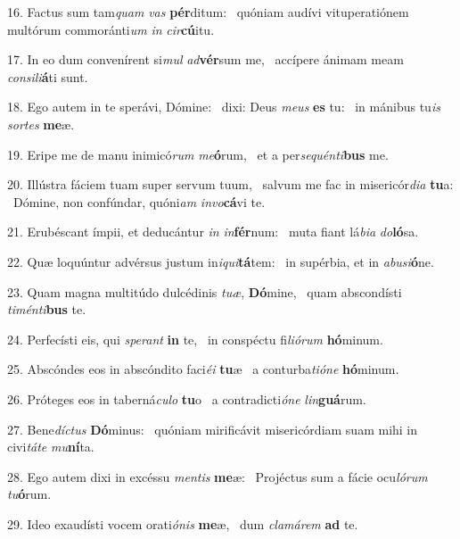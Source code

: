 16. Factus sum tam\textit{quam} \textit{vas} \textbf{pér}ditum: \ast\  quóniam audívi vituperatiónem multórum commoránti\textit{um} \textit{in} \textit{cir}\textbf{cú}itu.\

17. In eo dum convenírent si\textit{mul} \textit{ad}\textbf{vér}sum me, \ast\  accípere ánimam meam \textit{con}\textit{si}\textit{li}\textbf{á}ti sunt.\

18. Ego autem in te sperávi, Dómine: \dag\  dixi: Deus \textit{me}\textit{us} \textbf{es} tu: \ast\  in mánibus tu\textit{is} \textit{sor}\textit{tes} \textbf{me}æ.\

19. Eripe me de manu inimicó\textit{rum} \textit{me}\textbf{ó}rum, \ast\  et a per\textit{se}\textit{quén}\textit{ti}\textbf{bus} me.\

20. Illústra fáciem tuam super servum tuum, \dag\  salvum me fac in misericór\textit{di}\textit{a} \textbf{tu}a: \ast\  Dómine, non confúndar, quóni\textit{am} \textit{in}\textit{vo}\textbf{cá}vi te.\

21. Erubéscant ímpii, et deducántur \textit{in} \textit{in}\textbf{fér}num: \ast\  muta fiant lá\textit{bi}\textit{a} \textit{do}\textbf{ló}sa.\

22. Quæ loquúntur advérsus justum in\textit{i}\textit{qui}\textbf{tá}tem: \ast\  in supérbia, et in \textit{ab}\textit{u}\textit{si}\textbf{ó}ne.\

23. Quam magna multitúdo dulcédinis \textit{tu}\textit{æ}, \textbf{Dó}mine, \ast\  quam abscondísti \textit{ti}\textit{mén}\textit{ti}\textbf{bus} te.\

24. Perfecísti eis, qui \textit{spe}\textit{rant} \textbf{in} te, \ast\  in conspéctu fi\textit{li}\textit{ó}\textit{rum} \textbf{hó}minum.\

25. Abscóndes eos in abscóndito faci\textit{é}\textit{i} \textbf{tu}æ \ast\  a conturba\textit{ti}\textit{ó}\textit{ne} \textbf{hó}minum.\

26. Próteges eos in taberná\textit{cu}\textit{lo} \textbf{tu}o \ast\  a contradicti\textit{ó}\textit{ne} \textit{lin}\textbf{guá}rum.\

27. Bene\textit{díc}\textit{tus} \textbf{Dó}minus: \ast\  quóniam mirificávit misericórdiam suam mihi in civi\textit{tá}\textit{te} \textit{mu}\textbf{ní}ta.\

28. Ego autem dixi in excéssu \textit{men}\textit{tis} \textbf{me}æ: \ast\  Projéctus sum a fácie ocu\textit{ló}\textit{rum} \textit{tu}\textbf{ó}rum.\

29. Ideo exaudísti vocem orati\textit{ó}\textit{nis} \textbf{me}æ, \ast\  dum \textit{cla}\textit{má}\textit{rem} \textbf{ad} te.\

